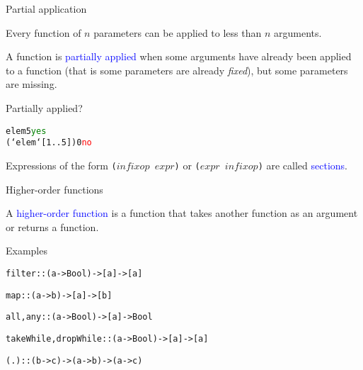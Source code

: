 \documentclass{beamer}
\def\code#1{\texttt{\frenchspacing#1}}
\begin{document}
\begin{frame}[fragile]{Partial application}

Every function of $n$ parameters can be applied to less than $n$ arguments.

A function is \textcolor{blue}{partially applied} when some arguments have already been applied to a function (that is some parameters are already \textit{fixed}), but some parameters are missing.

\pause

\vspace{1cm}
Partially applied?
\begin{alltt}
elem 5\pause             \textcolor{green}{yes}
(`elem` [1..5]) 0  \textcolor{red}{no}
\end{alltt}

\pause

Expressions of the form \code{($infixop$ $expr$)} or \code{($expr$ $infixop$)} are called \textcolor{blue}{sections}.

\end{frame}

\begin{frame}[fragile]{Higher-order functions}

A \textcolor{blue}{higher-order function} is a function that takes another function as an argument or returns a function.

\pause

\begin{exampleblock}{Examples}
\begin{alltt}
filter :: (a -> Bool) -> [a] -> [a]\pause

map :: (a -> b) -> [a] -> [b]\pause

all, any :: (a -> Bool) -> [a] -> Bool\pause

takeWhile, dropWhile :: (a -> Bool) -> [a] -> [a]\pause

(.) :: (b -> c) -> (a -> b) -> (a -> c)
\end{alltt}
\end{exampleblock}

\end{frame}
\end{document}
